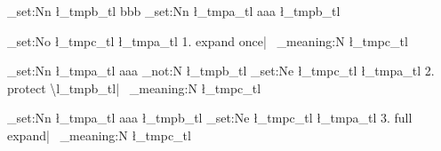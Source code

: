 \documentclass{article}
\begin{document}
\ExplSyntaxOn
\tl_set:Nn \l_tmpb_tl {bbb}
\tl_set:Nn \l_tmpa_tl {aaa \l_tmpb_tl}


\tl_set:No \l_tmpc_tl { \l_tmpa_tl }
1. expand once|~ \cs_meaning:N \l_tmpc_tl\par

\tl_set:Nn \l_tmpa_tl {aaa \exp_not:N \l_tmpb_tl}
\tl_set:Ne \l_tmpc_tl { \l_tmpa_tl }
2. protect \textbackslash l_tmpb_tl|~ \cs_meaning:N \l_tmpc_tl\par

\tl_set:Nn \l_tmpa_tl {aaa \l_tmpb_tl}
\tl_set:Ne \l_tmpc_tl { \l_tmpa_tl }
3. full expand|~ \cs_meaning:N \l_tmpc_tl
\ExplSyntaxOff
\end{document}
